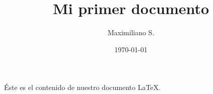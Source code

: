 \documentclass[12pt ,letterpaper]{article}
\title{Mi primer documento}
\author{Maximiliano S.}
\date{\today}
\begin{document}
    \begin{titlepage}
        \maketitle
    \end{titlepage}

    Éste es el contenido de nuestro documento \LaTeX.
\end{document}
